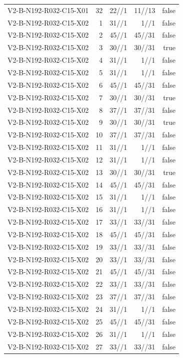 {\begin{longtable}{lrrrr}
V2-B-N192-R032-C15-X01 & 32 & 22//1 & 11//13 & false \\
V2-B-N192-R032-C15-X02 & 1 & 31//1 & 1//1 & false \\
V2-B-N192-R032-C15-X02 & 2 & 45//1 & 45//31 & false \\
V2-B-N192-R032-C15-X02 & 3 & 30//1 & 30//31 & true \\
V2-B-N192-R032-C15-X02 & 4 & 31//1 & 1//1 & false \\
V2-B-N192-R032-C15-X02 & 5 & 31//1 & 1//1 & false \\
V2-B-N192-R032-C15-X02 & 6 & 45//1 & 45//31 & false \\
V2-B-N192-R032-C15-X02 & 7 & 30//1 & 30//31 & true \\
V2-B-N192-R032-C15-X02 & 8 & 37//1 & 37//31 & false \\
V2-B-N192-R032-C15-X02 & 9 & 30//1 & 30//31 & true \\
V2-B-N192-R032-C15-X02 & 10 & 37//1 & 37//31 & false \\
V2-B-N192-R032-C15-X02 & 11 & 31//1 & 1//1 & false \\
V2-B-N192-R032-C15-X02 & 12 & 31//1 & 1//1 & false \\
V2-B-N192-R032-C15-X02 & 13 & 30//1 & 30//31 & true \\
V2-B-N192-R032-C15-X02 & 14 & 45//1 & 45//31 & false \\
V2-B-N192-R032-C15-X02 & 15 & 31//1 & 1//1 & false \\
V2-B-N192-R032-C15-X02 & 16 & 31//1 & 1//1 & false \\
V2-B-N192-R032-C15-X02 & 17 & 33//1 & 33//31 & false \\
V2-B-N192-R032-C15-X02 & 18 & 45//1 & 45//31 & false \\
V2-B-N192-R032-C15-X02 & 19 & 33//1 & 33//31 & false \\
V2-B-N192-R032-C15-X02 & 20 & 33//1 & 33//31 & false \\
V2-B-N192-R032-C15-X02 & 21 & 45//1 & 45//31 & false \\
V2-B-N192-R032-C15-X02 & 22 & 33//1 & 33//31 & false \\
V2-B-N192-R032-C15-X02 & 23 & 37//1 & 37//31 & false \\
V2-B-N192-R032-C15-X02 & 24 & 31//1 & 1//1 & false \\
V2-B-N192-R032-C15-X02 & 25 & 45//1 & 45//31 & false \\
V2-B-N192-R032-C15-X02 & 26 & 31//1 & 1//1 & false \\
V2-B-N192-R032-C15-X02 & 27 & 33//1 & 33//31 & false \\

\end{longtable}}

